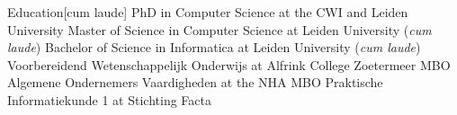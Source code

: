 
\begin{rubric}{Education}[cum laude]
		PhD in Computer Science at the CWI and Leiden University
		Master of Science in Computer Science at Leiden University (\emph{cum laude})
		Bachelor of Science in Informatica at Leiden University (\emph{cum laude})
		Voorbereidend Wetenschappelijk Onderwijs at Alfrink College Zoetermeer
		MBO Algemene Ondernemers Vaardigheden at the NHA
		MBO Praktische Informatiekunde 1 at Stichting Facta
\end{rubric}
